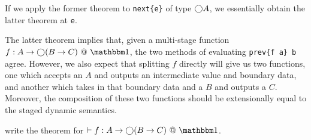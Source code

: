 If we apply the former theorem to \verb|next{e}| of type $\bigcirc A$, we
essentially obtain the latter theorem at \verb|e|.

The latter theorem implies that, given a multi-stage function $f:A\to\fut(B\to
C)~@~\bbone$, the two methods of evaluating \verb|prev{f a} b| agree.
However, we also expect that splitting $f$ directly will give us two functions,
one which accepts an $A$ and outputs an intermediate value and boundary data,
and another which takes in that boundary data and a $B$ and outputs a $C$.
Moreover, the composition of these two functions should be extensionally equal
to the staged dynamic semantics.

\TODO write the theorem for $\vdash f:A\to\fut(B\to C)~@~\bbone$.

%
%
%
%
